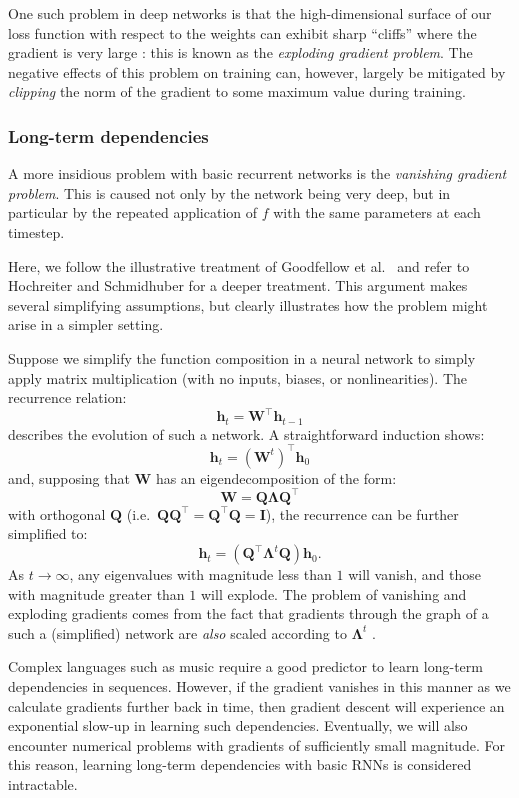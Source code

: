 \documentclass[12pt,a4paper,twoside,openright]{report}
\newcommand{\vect}[1]{\boldsymbol{\mathbf{#1}}}
\begin{document}
One such problem in deep networks is that the high-dimensional surface of our
loss function with respect to the weights can exhibit sharp ``cliffs'' where the
gradient is very large \cite{Goodfellow-et-al-2016}: this is known as the
\emph{exploding gradient problem}. The negative effects of this problem on
training can, however, largely be mitigated by \emph{clipping} the norm of the
gradient to some maximum value during training.

\subsubsection{Long-term dependencies}

A more insidious problem with basic recurrent networks is the \emph{vanishing
gradient problem}. This is caused not only by the network being very deep, but
in particular by the repeated application of $f$ with the same parameters at
each timestep.

Here, we follow the illustrative treatment of Goodfellow et al.\
\cite{Goodfellow-et-al-2016} and refer to Hochreiter and Schmidhuber
\cite{hochreiter1997long} for a deeper treatment. This argument makes several
simplifying assumptions, but clearly illustrates how the problem might arise in
a simpler setting.

Suppose we simplify the function composition in a neural network to simply apply
matrix multiplication (with no inputs, biases, or nonlinearities). The
recurrence relation: 
$$ \vect{h}_t = \vect{W}^\top \vect{h}_{t-1} $$ 
describes the evolution of such a network. A straightforward induction shows:
$$ \vect{h}_t = (\vect{W}^t)^\top\vect{h}_0 $$
and, supposing that $\vect{W}$ has an eigendecomposition of the form:
$$ \vect{W} = \vect{Q}\vect{\Lambda}\vect{Q}^\top $$
with orthogonal $\vect{Q}$ (i.e.\ $\vect{Q}\vect{Q}^\top = \vect{Q}^\top\vect{Q}
= \vect{I}$), the recurrence can be further simplified to:
$$ \vect{h}_t = (\vect{Q}^\top \vect{\Lambda}^t \vect{Q}) \vect{h}_0. $$
As $t \rightarrow \infty$, any eigenvalues with magnitude less than $1$ will
vanish, and those with magnitude greater than $1$ will explode. The problem of
vanishing and exploding gradients comes from the fact that gradients through the
graph of a such a (simplified) network are \emph{also} scaled according to
$\vect{\Lambda}^t$ \cite{Goodfellow-et-al-2016}.

Complex languages such as music require a good predictor to learn long-term
dependencies in sequences. However, if the gradient vanishes in this manner as
we calculate gradients further back in time, then gradient descent will
experience an exponential slow-up in learning such dependencies. Eventually,
we will also encounter numerical problems with gradients of sufficiently small
magnitude. For this reason, learning long-term dependencies with basic RNNs is
considered intractable.
\end{document}

